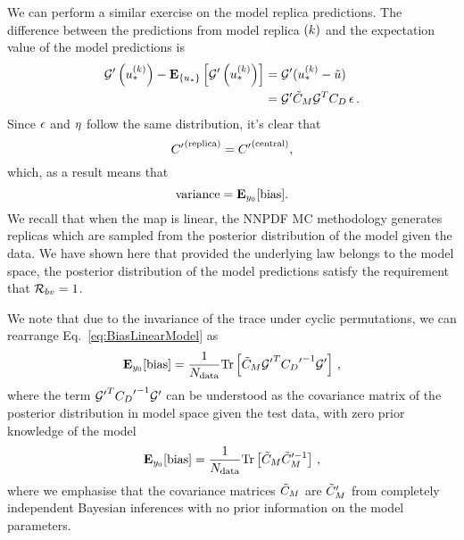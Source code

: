 We can perform a similar exercise on the model replica predictions. The difference
between the predictions from model replica $(k)$ and the expectation value
of the model predictions is
\begin{equation}
    \begin{split}
        {{\mathcal{G}}^{\prime}}\left(u_*^{(k)}\right) -
        \mathbf{E}_{\{ u_* \}} \left[ {{\mathcal{G}}^{\prime}}\left(u_*^{(k)}\right) \right] &=
        {{\mathcal{G}}^{\prime}} (u_*^{(k)} - \tilde{u}) \\
        &= {{\mathcal{G}}^{\prime}} \tilde{C}_M \mathcal{G}^T C_{D} \, \epsilon \, .
    \end{split}
\end{equation}
Since $\epsilon$ and $\eta$ follow the same distribution, it's clear that
\begin{equation}
    {{C}^{\prime}}^{(\rm replica)} = {{C}^{\prime}}^{(\rm central)},
\end{equation}
which, as a result means that
\begin{equation}
    {\rm variance} = \mathbf{E}_{y_0}[{\rm bias}].
\end{equation}
We recall that when the map is linear, the NNPDF MC methodology generates replicas
which are sampled from the posterior distribution of the model given the data.
We have shown here that provided the underlying law belongs to the model
space, the posterior distribution of the model predictions satisfy the
requirement that $\mathcal{R}_{bv} = 1$.

We note that due to the invariance of the trace under cyclic permutations, we
can rearrange Eq.~\ref{eq:BiasLinearModel} as
\begin{equation}
    \mathbf{E}_{y_0}[{\rm bias}] = \frac{1}{N_{\rm data}}
    {\rm Tr} \left[
        \tilde{C}_M
        {{\mathcal{G}}^{\prime}}^T {{C_{D}}^{\prime}}^{-1} {{\mathcal{G}}^{\prime}}
    \right] \, ,
\end{equation}
where the term ${{\mathcal{G}}^{\prime}}^T {{C_{D}}^{\prime}}^{-1} {{\mathcal{G}}^{\prime}}$
can be understood as the covariance matrix of the posterior distribution in model
space given the test data, with zero prior knowledge of the model \viz
\begin{equation}\label{eq:BiasTraceModelPost}
    \mathbf{E}_{y_0}[{\rm bias}] = \frac{1}{N_{\rm data}}
    {\rm Tr} \left[ \tilde{C}_M {\tilde{C}_M}^{ \prime -1} \right] \, ,
\end{equation}
where we emphasise that the covariance matrices $\tilde{C}_M$ are
${{\tilde{C}_M}^{\prime}}$ from completely independent Bayesian inferences
with no prior information on the model parameters.

